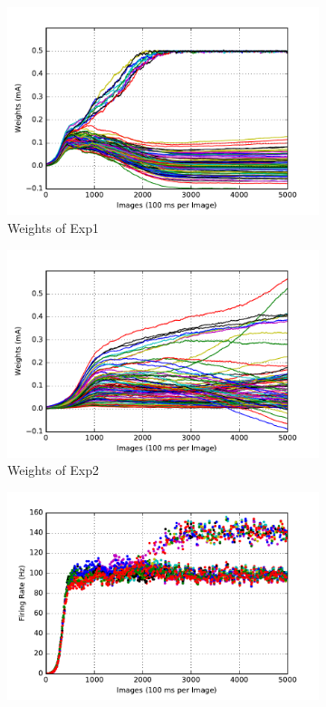 \begin{figure}
	\centering
	\begin{subfigure}[t]{0.45\textwidth}
		\includegraphics[width=\textwidth]{pics_sdlm/10_exp_SRBM_Orig/exp1_weights_s.pdf}
		\caption{Weights of Exp1}
	\end{subfigure}
	\begin{subfigure}[t]{0.45\textwidth}
		\includegraphics[width=\textwidth]{pics_sdlm/10_exp_SRBM_Orig/exp2_weights_s.pdf}
		\caption{Weights of Exp2}
	\end{subfigure}
	\begin{subfigure}[t]{0.45\textwidth}
		\includegraphics[width=\textwidth]{pics_sdlm/10_exp_SRBM_Orig/exp1_recon_s.pdf}

\end{subfigure}
\end{figure}
